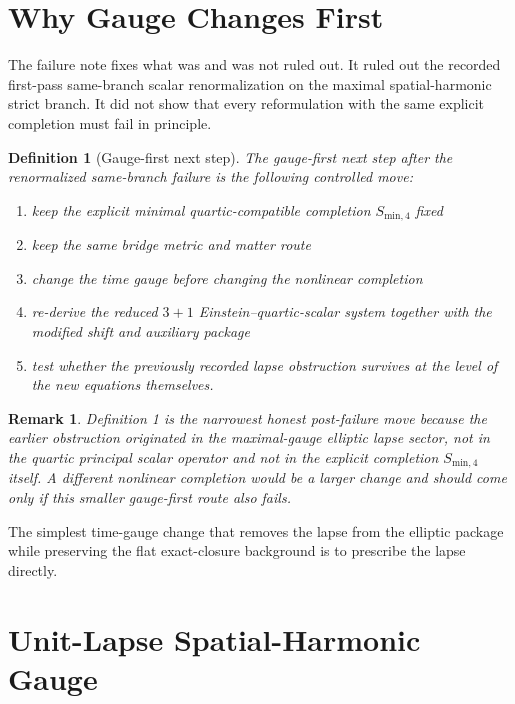 \documentclass[11pt]{article}
\newtheorem{definition}{Definition}
\newtheorem{remark}{Remark}
\begin{document}
\section{Why Gauge Changes First}

The failure note fixes what was and was not ruled out. It ruled out the recorded first-pass same-branch scalar renormalization on the maximal spatial-harmonic strict branch. It did not show that every reformulation with the same explicit completion must fail in principle.

\begin{definition}[Gauge-first next step]
The \emph{gauge-first next step} after the renormalized same-branch failure is the following controlled move:
\begin{enumerate}
    \item keep the explicit minimal quartic-compatible completion \(S_{\mathrm{min},4}\) fixed
    \item keep the same bridge metric and matter route
    \item change the time gauge before changing the nonlinear completion
    \item re-derive the reduced \(3+1\) Einstein--quartic-scalar system together with the modified shift and auxiliary package
    \item test whether the previously recorded lapse obstruction survives at the level of the new equations themselves.
\end{enumerate}
\end{definition}

\begin{remark}
Definition 1 is the narrowest honest post-failure move because the earlier obstruction originated in the maximal-gauge elliptic lapse sector, not in the quartic principal scalar operator and not in the explicit completion \(S_{\mathrm{min},4}\) itself. A different nonlinear completion would be a larger change and should come only if this smaller gauge-first route also fails.
\end{remark}

The simplest time-gauge change that removes the lapse from the elliptic package while preserving the flat exact-closure background is to prescribe the lapse directly.

\section{Unit-Lapse Spatial-Harmonic Gauge}
\end{document}
